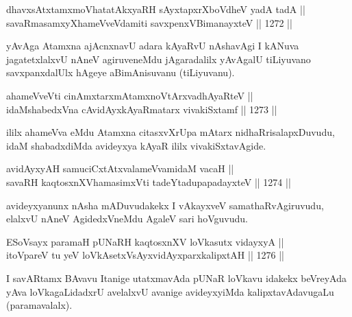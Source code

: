 
\begin{shl}
dhavxsAtxtamxmoVhatatAkxyaRH sAyxtapxrXboVdheV yadA tadA || \\
savaRmasamxyXhameVveVdamiti savxpenxV\s BimanayxteV ||  1272 || 
\end{shl}

\begin{artha}
yAvAga Atamxna ajAcnxnavU adara kAyaRvU nAshavAgi I kANuva jagatetxlalxvU nAneV agiruveneMdu jAgaradalilx yAvAgalU tiLiyuvano savxpanxdalUlx hAgeye aBimAnisuvanu (tiLiyuvanu).
\end{artha}


\begin{shl}
ahameVveVti cinAmxtarxmAtamxnoV\s tArxvadhAyaRteV || \\
idaMshabedxVna cAvidAyxkAyaRmatarx vivakiSxtamf ||  1273 ||  
\end{shl}

\begin{artha}
ililx ahameVva eMdu Atamxna citasxvXrUpa mAtarx nidhaRrisalapxDuvudu, idaM shabadxdiMda avideyxya kAyaR ililx vivakiSxtavAgide.
\end{artha}


\begin{shl}
avidAyxyAH samuciCxtAtxvalameVvamidaM vacaH || \\
\footnotemark[1]savaRH kaqtosxnXV\s hamasimxVti tadeYtadupapadayxteV ||  1274 ||  
\end{shl}

\begin{artha}
avideyxyanunx nAsha mADuvudakekx I vAkayxveV samathaRvAgiruvudu, elalxvU nAneV AgidedxVneMdu AgaleV sari hoVguvudu.
\end{artha}


\begin{shl}
ESoV\s sayx paramaH pUNaRH kaqtosxnXV loVkasutx vidayxyA || \\
itoV\s pareV tu yeV loVkAsetxV\s sAyxvidAyxparxkalipxtAH ||  1276 ||  
\end{shl}

\begin{artha}
I savARtamx BAvavu Itanige utatxmavAda pUNaR loVkavu idakekx beVreyAda yAva loVkagaLidadxrU avelalxvU avanige avideyxyiMda kalipxtavAdavugaLu (paramavalalx).
\end{artha}

